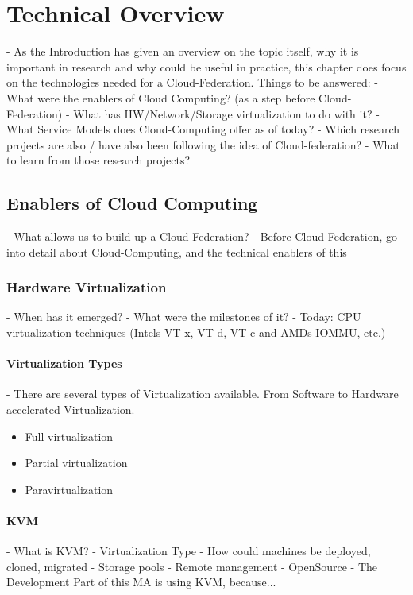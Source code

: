 \chapter{Technical Overview}
- As the Introduction has given an overview on the topic itself, why it is important in research and why could be useful in practice,
this chapter does focus on the technologies needed for a Cloud-Federation. \newline
Things to be answered: \newline
- What were the enablers of Cloud Computing? (as a step before Cloud-Federation)
- What has HW/Network/Storage virtualization to do with it?
- What Service Models does Cloud-Computing offer as of today?
- Which research projects are also / have also been following the idea of Cloud-federation?
- What to learn from those research projects?

\section{Enablers of Cloud Computing}
- What allows us to build up a Cloud-Federation?
- Before Cloud-Federation, go into detail about Cloud-Computing, and the technical enablers of this

\subsection{Hardware Virtualization}
- When has it emerged?
- What were the milestones of it?
- Today: CPU virtualization techniques (Intels VT-x, VT-d, VT-c and AMDs IOMMU, etc.)

\subsubsection{Virtualization Types}
- There are several types of Virtualization available. From Software to Hardware accelerated Virtualization.
\begin{itemize}
	\item Full virtualization
	\item Partial virtualization
	\item Paravirtualization
\end{itemize}

\subsubsection{KVM}
- What is KVM?
- Virtualization Type
- How could machines be deployed, cloned, migrated
- Storage pools
- Remote management
- OpenSource
- The Development Part of this MA is using KVM, because...

